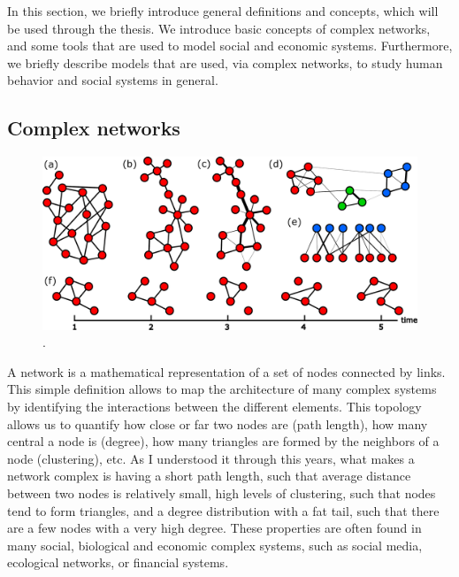 In this section, we briefly introduce general definitions and concepts, which will be used through the thesis. We introduce basic concepts of complex networks, and some tools that are used to model social and economic systems. Furthermore, we briefly describe models that are used, via complex networks, to study human behavior and social systems in general.

\subsection{\label{subsec:Complex networks} Complex networks}

\begin{figure}
    \centering
    \captionsetup{font=sf}
    \includegraphics[width=\textwidth]{Figs/Introduction/network_plot.pdf}
    \caption[Different network types]{.}
    \label{fig:netwotk_types}
\end{figure}

A network is a mathematical representation of a set of nodes connected by links. This simple definition allows to map the architecture of many complex systems by identifying the interactions between the different elements. This topology allows us to quantify how close or far two nodes are (path length), how many central a node is (degree), how many triangles are formed by the neighbors of a node (clustering), etc. As I understood it through this years, what makes a network complex is having a short path length, such that average distance between two nodes is relatively small, high levels of clustering, such that nodes tend to form triangles, and a degree distribution with a fat tail, such that there are a few nodes with a very high degree. These properties are often found in many social, biological and economic complex systems, such as social media, ecological networks, or financial systems.

